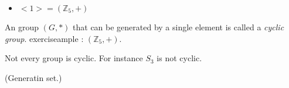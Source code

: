 \begin{example}
\begin{itemize}
\item $<1> = (\mathbb{Z}_5,+)$
\end{itemize}
\end{example}


\begin{definition}An group $(G,*)$ that can be generated by a single element is called a {\em cyclic group}. exerciseample : $(\mathbb{Z}_5,+)$.
\end{definition}

Not every group is cyclic. For instance $S_3$ is not cyclic.

\begin{definition}(Generatin set.)

\end{definition}
